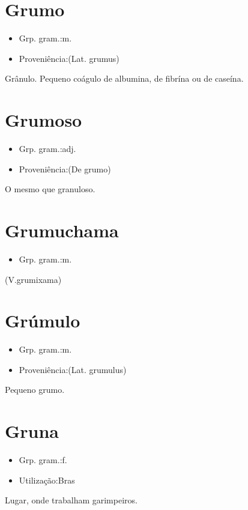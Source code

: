 \section{Grumo}
\begin{itemize}
\item {Grp. gram.:m.}
\end{itemize}
\begin{itemize}
\item {Proveniência:(Lat. \textunderscore grumus\textunderscore )}
\end{itemize}
Grânulo.
Pequeno coágulo de albumina, de fibrína ou de caseína.
\section{Grumoso}
\begin{itemize}
\item {Grp. gram.:adj.}
\end{itemize}
\begin{itemize}
\item {Proveniência:(De \textunderscore grumo\textunderscore )}
\end{itemize}
O mesmo que \textunderscore granuloso\textunderscore .
\section{Grumuchama}
\begin{itemize}
\item {Grp. gram.:m.}
\end{itemize}
(V.grumixama)
\section{Grúmulo}
\begin{itemize}
\item {Grp. gram.:m.}
\end{itemize}
\begin{itemize}
\item {Proveniência:(Lat. \textunderscore grumulus\textunderscore )}
\end{itemize}
Pequeno grumo.
\section{Gruna}
\begin{itemize}
\item {Grp. gram.:f.}
\end{itemize}
\begin{itemize}
\item {Utilização:Bras}
\end{itemize}
Lugar, onde trabalham garimpeiros.
